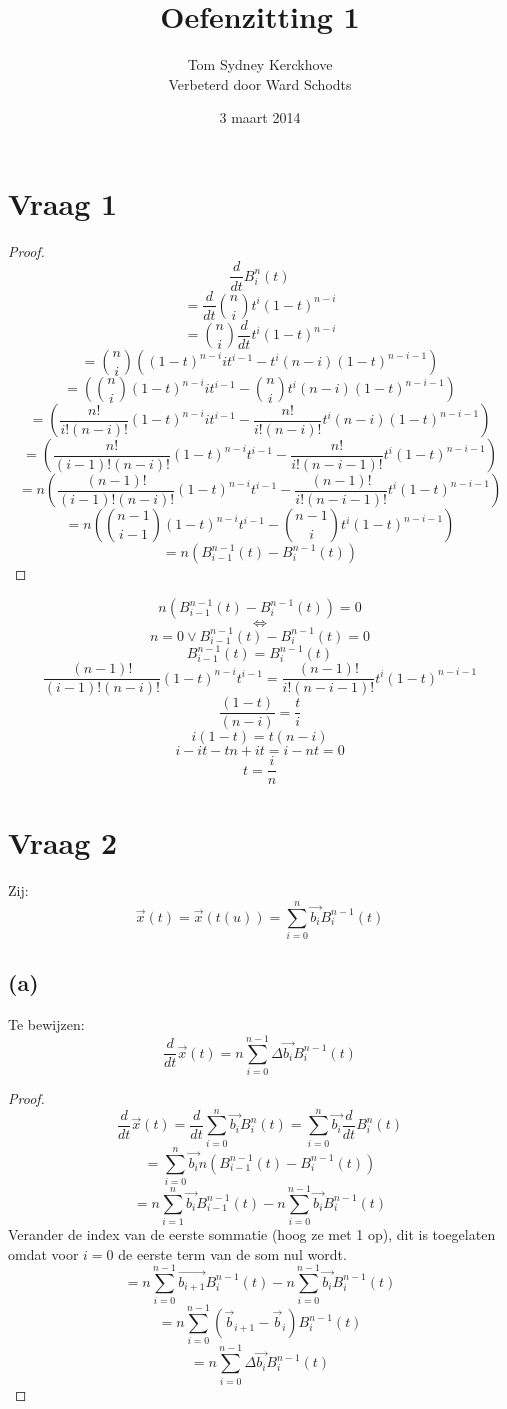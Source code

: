 \documentclass[10pt,a4paper]{article}
\title{Oefenzitting 1}
\author{Tom Sydney Kerckhove
		\\ Verbeterd door Ward Schodts}
\date{3 maart 2014}
\begin{document}
\maketitle

\section{Vraag 1}
\begin{proof}
\[
\frac{d}{dt}B^{n}_{i}(t)
\]
\[
= \frac{d}{dt}\binom{n}{i}t^i(1-t)^{n-i}
\]
\[
= \binom{n}{i}\frac{d}{dt}t^i(1-t)^{n-i}
\]
\[
= \binom{n}{i}
\left(
(1-t)^{n-i}it^{i-1} - t^i(n-i)(1-t)^{n-i-1}
\right)
\]
\[
=
\left(
\binom{n}{i}(1-t)^{n-i}it^{i-1} - \binom{n}{i}t^i(n-i)(1-t)^{n-i-1}
\right)
\]
\[
=
\left(
\frac{n!}{i!(n-i)!}(1-t)^{n-i}it^{i-1} - \frac{n!}{i!(n-i)!}t^i(n-i)(1-t)^{n-i-1}
\right)
\]
\[
=
\left(
\frac{n!}{(i-1)!(n-i)!}(1-t)^{n-i}t^{i-1} - \frac{n!}{i!(n-i-1)!}t^i(1-t)^{n-i-1}
\right)
\]
\[
=
n
\left(
\frac{(n-1)!}{(i-1)!(n-i)!}(1-t)^{n-i}t^{i-1} - \frac{(n-1)!}{i!(n-i-1)!}t^i(1-t)^{n-i-1}
\right)
\]
$$
=
n
\left(
\binom{n-1}{i-1}(1-t)^{n-i}t^{i-1} -
\binom{n-1}{i}t^i(1-t)^{n-i-1}
\right)
$$
\[
=
n
\left(
B^{n-1}_{i-1}(t) - B^{n-1}_{i}(t)
\right)
\]
\end{proof}
\[
n
\left(
B^{n-1}_{i-1}(t) - B^{n-1}_{i}(t)
\right)
=0
\]
\[
\Leftrightarrow
\] 
\[
n=0 \lor B^{n-1}_{i-1}(t) - B^{n-1}_{i}(t) = 0
\]
\[
B^{n-1}_{i-1}(t) = B^{n-1}_{i}(t)
\]
\[
\frac{(n-1)!}{(i-1)!(n-i)!}(1-t)^{n-i}t^{i-1} = \frac{(n-1)!}{i!(n-i-1)!}t^i(1-t)^{n-i-1}
\]
\[
\frac{(1-t)}{(n-i)} = \frac{t}{i}
\]
\[
i(1-t)=t(n-i) 
\]
\[
i-it-tn+it= i-nt =0
\]
\[
t = \frac{i}{n}
\]

\section{Vraag 2}
Zij:
\[
\vec{x}(t) = \vec{x}(t(u)) = \sum_{i=0}^{n}\vec{b_{i}}B_{i}^{n-1}(t)
\]
\subsection*{(a)}
Te bewijzen:
\[
\frac{d}{dt}\vec{x}(t) = n\sum_{i=0}^{n-1}\Delta\vec{b_i}B_{i}^{n-1}(t)
\]
\begin{proof}
\[
\frac{d}{dt}\vec{x}(t)
= \frac{d}{dt}\sum_{i=0}^{n}\vec{b_{i}}B_{i}^{n}(t)
= \sum_{i=0}^{n}\vec{b_{i}} \frac{d}{dt}B_{i}^{n}(t)
\]
\[
= \sum_{i=0}^{n}\vec{b_{i}}n
\left(
B^{n-1}_{i-1}(t) - B^{n-1}_{i}(t)
\right)
\]
\[
= n
\sum_{i=1}^{n}
\vec{b_{i}}B^{n-1}_{i-1}(t)
-n 
\sum_{i=0}^{n-1}
\vec{b_{i}}B^{n-1}_{i}(t)
\]
Verander de index van de eerste sommatie (hoog ze met 1 op), dit is toegelaten omdat voor $i=0$ de eerste term van de som nul wordt.
\[
= n
\sum_{i=0}^{n-1}
\vec{b_{i+1}}B^{n-1}_{i}(t)
-n 
\sum_{i=0}^{n-1}
\vec{b_{i}}B^{n-1}_{i}(t)
\]
\[
= n
\sum_{i=0}^{n-1}
(\vec{b}_{i+1}-\vec{b}_{i})B^{n-1}_{i}(t)
\]
\[
= n
\sum_{i=0}^{n-1}\Delta\vec{b_{i}}B^{n-1}_{i}(t)
\]
\end{proof}
\end{document}
